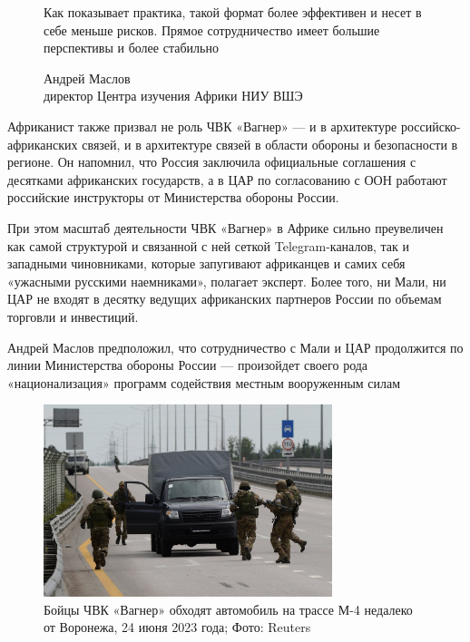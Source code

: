 \begin{figure}
    \begin{fancyquotes}
        Как показывает практика, такой формат более эффективен и несет в себе меньше рисков. Прямое сотрудничество имеет большие перспективы и более стабильно

        \begin{flushright}
            Андрей Маслов\\
            директор Центра изучения Африки НИУ ВШЭ
        \end{flushright}
    \end{fancyquotes}
\end{figure}
Африканист также призвал не  роль ЧВК «Вагнер» --- и в архитектуре российско-африканских связей, и в архитектуре связей в области обороны и безопасности в регионе. Он напомнил, что Россия заключила официальные соглашения с десятками африканских государств, а в ЦАР по согласованию с ООН работают российские инструкторы от Министерства обороны России.

При этом масштаб деятельности ЧВК «Вагнер» в Африке сильно преувеличен как самой структурой и связанной с ней сеткой Telegram-каналов, так и западными чиновниками, которые запугивают африканцев и самих себя «ужасными русскими наемниками», полагает эксперт. Более того, ни Мали, ни ЦАР не входят в десятку ведущих африканских партнеров России по объемам торговли и инвестиций.

\begin{center}
    \Large
    Андрей Маслов предположил, что сотрудничество с Мали и ЦАР продолжится по линии Министерства обороны России — произойдет своего рода «национализация» программ содействия местным вооруженным силам
\end{center}

\begin{figure}[h]
    \centering
    \includegraphics[width=0.75\textwidth]{img/pmc_africa_4.jpg}
    \caption{Бойцы ЧВК «Вагнер» обходят автомобиль на трассе М-4 недалеко от Воронежа, 24 июня 2023 года; Фото: Reuters}
\end{figure}

